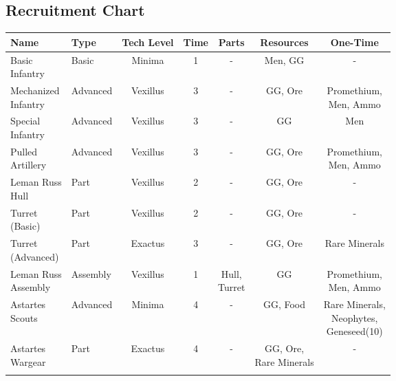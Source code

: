 \subsection{Recruitment Chart} \label{recruitment_chart}
\begin{center}
\begin{longtable}{l l c c c c c} \toprule
    Name & Type & Tech Level & Time & Parts & Resources & One-Time\\ \midrule\endhead
    \makecell[cl]{Basic \\Infantry} & Basic & Minima & 1 & - & Men, GG & - \\ \addlinespace
    \makecell[cl]{Mechanized\\Infantry} & Advanced & Vexillus & 3 & - & GG, Ore &  \makecell[cl]{Promethium,\\Men, Ammo} \\ \addlinespace
    \makecell[cl]{Special\\Infantry} & Advanced & Vexillus & 3 & - & GG & Men \\ \addlinespace
    \makecell[cl]{Pulled\\Artillery} & Advanced & Vexillus & 3 & - & GG, Ore & \makecell[cl]{Promethium,\\Men, Ammo} \\ \addlinespace
    \makecell[cl]{Leman Russ\\Hull}  & Part & Vexillus & 2 & - & GG, Ore & -\\ \addlinespace
    \makecell[cl]{Turret\\(Basic)} & Part & Vexillus & 2 & - & GG, Ore & - \\ \addlinespace
    \makecell[cl]{Turret\\(Advanced)}  & Part & Exactus & 3 & - & GG, Ore & Rare Minerals \\ \addlinespace
    \makecell[cl]{Leman Russ\\Assembly}  & Assembly & Vexillus & 1 & \makecell[cl]{Hull,\\Turret} & GG & \makecell[cl]{Promethium,\\Men, Ammo}\\\addlinespace
    \makecell[cl]{Astartes\\Scouts} & Advanced & Minima & 4 & - & GG, Food & \makecell[cl]{Rare Minerals,\\Neophytes,\\Geneseed(10)} \\ \addlinespace
    \makecell[cl]{Astartes\\Wargear} & Part & Exactus & 4 & - & \makecell[cc]{GG, Ore,\\Rare Minerals} & - \\ \addlinespace

\end{longtable}
\end{center}
